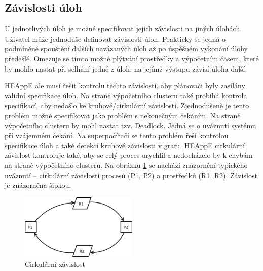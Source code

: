 \subsection{Závislosti úloh}
U jednotlivých úloh je možné specifikovat jejich závislosti na jiných úlohách. Uživatel může jednoduše definovat závislosti úloh. Prakticky se jedná o podmíněné spouštění dalších navázaných úloh až po úspěšném vykonání úlohy předešlé. Omezuje se tímto možné plýtvání prostředky a výpočetním časem, které by mohlo nastat při selhání jedné z úloh, na jejímž výstupu závisí úloha další.

HEAppE ale musí řešit kontrolu těchto závislostí, aby plánovači byly zasílány validní specifikace úloh. Na straně výpočetního clusteru také probíhá kontrola specifikací, aby nedošlo ke kruhové/cirkulární závislosti. Zjednodušeně je tento problém možné specifikovat jako problém s nekonečným čekáním. Na straně výpočetního clusteru by mohl nastat tzv. Deadlock. Jedná se o uváznutí systému při vzájemném čekání. Na superpočítači se tento problém řeší kontrolou specifikace úloh a také detekcí kruhové závislosti v grafu. HEAppE cirkulární závislost kontroluje také, aby se celý proces urychlil a nedocházelo by k chybám na straně výpočetního clusteru. Na obrázku \ref{fig:cirkularni-zavislost} se nachází znázornění typického uváznutí – cirkulární závislosti procesů (P1, P2) a prostředků (R1, R2). Závislost je znázorněna šipkou.


\begin{figure}[!h]
	\centering
	\includegraphics[width=0.5\textwidth]{Figures/Process_deadlock.png}
	\caption{Cirkulární závislost \cite{OvBwjLleECKerU0E}}
	\label{fig:cirkularni-zavislost}
\end{figure}

